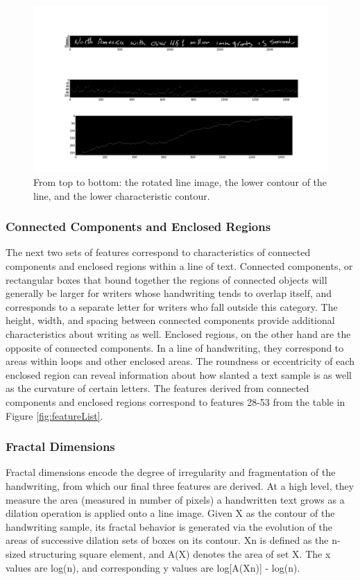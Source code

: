 \documentclass[paper=a4, fontsize=11pt]{scrartcl} %
\numberwithin{equation}{section} %
\numberwithin{figure}{section} %
\numberwithin{table}{section} %
\begin{document}
\begin{figure}
  \centering \includegraphics{contourimage.png}
  \caption{From top to bottom: the rotated line image, the lower
    contour of the line, and the lower characteristic contour.}
  \label{fig:contourimage}
\end{figure}

\subsubsection{Connected Components and Enclosed Regions}
The next two sets of features correspond to characteristics of connected components and enclosed regions within a line of text. Connected components, or rectangular boxes that bound together the regions of connected objects will generally be larger for writers whose handwriting tends to overlap itself, and corresponds to a separate letter for writers who fall outside this category. The height, width, and spacing between connected components provide additional characteristics about writing as well. Enclosed regions, on the other hand are the opposite of connected components. In a line of handwriting, they correspond to areas within loops and other enclosed areas. The roundness or eccentricity of each enclosed region can reveal information about how slanted a text sample is as well as the curvature of certain letters. The features derived from connected components and enclosed regions correspond to features 28-53 from the table in Figure
\ref{fig:featureList}.

\subsubsection{Fractal Dimensions}
Fractal dimensions encode the degree of irregularity and fragmentation
of the handwriting, from which our final three features are
derived\cite{FractalDimensions}. At a high level, they measure the
area (measured in number of pixels) a handwritten text grows as a
dilation operation is applied onto a line image. Given X as the
contour of the handwriting sample, its fractal behavior is generated
via the evolution of the areas of successive dilation sets of boxes on
its contour. Xn is defined as the n-sized structuring square element,
and A(X) denotes the area of set X. The x values are log(n), and
corresponding y values are log[A(Xn)] - log(n).
\end{document}
